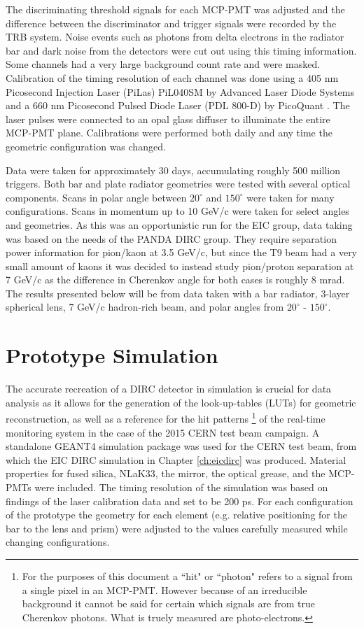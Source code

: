 The discriminating threshold signals for each MCP-PMT was adjusted and the difference between the discriminator and trigger signals were recorded by the TRB system. Noise events such as photons from delta electrons in the radiator bar and dark noise from the detectors were cut out using this timing information. Some channels had a very large background count rate and were masked. Calibration of the timing resolution of each channel was done using a 405 nm Picosecond Injection Laser (PiLas) PiL040SM by Advanced Laser Diode Systems \cite{PiLas} and a 660 nm Picosecond Pulsed Diode Laser (PDL 800-D) by PicoQuant \cite{PicoQuant}. The laser pulses were connected to an opal glass diffuser to illuminate the entire MCP-PMT plane. Calibrations were performed both daily and any time the geometric configuration was changed.

Data were taken for approximately 30 days, accumulating roughly 500 million triggers. Both bar and plate radiator geometries were tested with several optical components. Scans in polar angle between $20^\circ$ and $150^\circ$ were taken for many configurations. Scans in momentum up to 10 GeV/c were taken for select angles and geometries. As this was an opportunistic run for the EIC group, data taking was based on the needs of the PANDA DIRC group. They require separation power information for pion/kaon at 3.5 GeV/c, but since the T9 beam had a very small amount of kaons it was decided to instead study pion/proton separation at 7 GeV/c as the difference in Cherenkov angle for both cases is roughly 8 mrad. The results presented below will be from data taken with a bar radiator, 3-layer spherical lens, 7 GeV/c hadron-rich beam, and polar angles from  $20^\circ$ - $150^\circ$.

\clearpage
\section{Prototype Simulation}
The accurate recreation of a DIRC detector in simulation is crucial for data analysis as it allows for the generation of the look-up-tables (LUTs) for geometric reconstruction, as well as a reference for the hit patterns \footnote{For the purposes of this document a ``hit" or ``photon" refers to a signal from a single pixel in an MCP-PMT. However because of an irreducible background it cannot be said for certain which signals are from true Cherenkov photons. What is truely measured are photo-electrons.} of the real-time monitoring system in the case of the 2015 CERN test beam campaign. A standalone GEANT4 simulation package was used for the CERN test beam, from which the EIC DIRC simulation in Chapter \ref{ch:eicdirc} was produced. Material properties for fused silica, NLaK33, the mirror, the optical grease, and the MCP-PMTs were included. The timing resolution of the simulation was based on findings of the laser calibration data and set to be 200 ps. For each configuration of the prototype the geometry for each element (e.g. relative positioning for the bar to the lens and prism) were adjusted to the values carefully measured while changing configurations.

